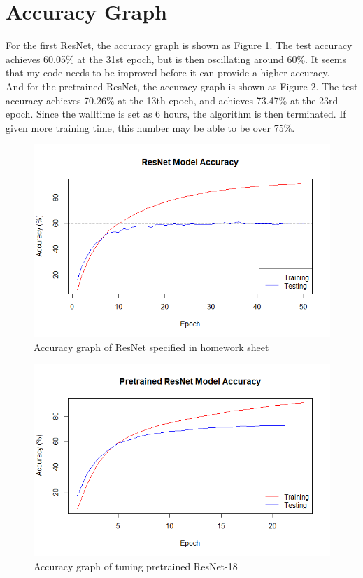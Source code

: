\documentclass[15pt]{article}
\begin{document}
\section{Accuracy Graph}
For the first ResNet, the accuracy graph is shown as Figure 1. The test accuracy achieves 60.05\% at the 31st epoch, but is then oscillating around 60\%. It seems that my code needs to be improved before it can provide a higher accuracy.\\
And for the pretrained ResNet, the accuracy graph is shown as Figure 2. The test accuracy achieves 70.26\% at the 13th epoch, and achieves 73.47\% at the 23rd epoch. Since the walltime is set as 6 hours, the algorithm is then terminated. If given more training time, this number may be able to be over 75\%.
\begin{figure}
\centering
\includegraphics[width=\textwidth]{"ResNet Scratch Model Accuracy"}
\caption{Accuracy graph of ResNet specified in homework sheet}
\end{figure}

\begin{figure}
\centering
\includegraphics[width=\textwidth]{"Pretrained Model Accuracy"}
\caption{Accuracy graph of tuning pretrained ResNet-18}
\end{figure}
\end{document}
